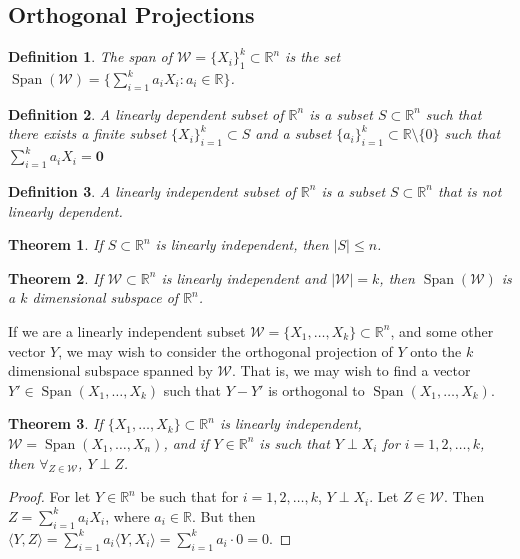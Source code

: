 \documentclass[oneside]{book}
\theoremstyle{mystyle}
\newtheorem{theorem}{Theorem}[section]
\newtheorem{definition}{Definition}[section]
\DeclareMathOperator{\Span}{Span}
\begin{document}
\subsection{Orthogonal Projections}
\begin{definition}
The span of $\mathcal{W}=\{X_{i}\}_{1}^{k} \subset \mathbb{R}^n$ is the set $\Span(\mathcal{W})=\{\sum_{i=1}^{k} a_i X_i: a_i \in \mathbb{R}\}$.
\end{definition}
\begin{definition}
A linearly dependent subset of $\mathbb{R}^{n}$ is a subset $S\subset\mathbb{R}^{n}$ such that there exists a finite subset $\{X_{i}\}_{i=1}^{k}\subset S$ and a subset $\{a_{i}\}_{i=1}^{k}\subset \mathbb{R}\setminus \{0\}$ such that $\sum_{i=1}^{k}a_{i}X_{i}=\mathbf{0}$
\end{definition}
\begin{definition}
A linearly independent subset of $\mathbb{R}^{n}$ is a subset $S\subset \mathbb{R}^{n}$ that is not linearly dependent.
\end{definition}
\begin{theorem}
If $S\subset\mathbb{R}^{n}$ is linearly independent, then $|S|\leq n$.
\end{theorem}
\begin{theorem}
If $\mathcal{W}\subset\mathbb{R}^{n}$ is linearly independent and $|\mathcal{W}| = k$, then $\Span(\mathcal{W})$ is a $k$ dimensional subspace of $\mathbb{R}^n$.
\end{theorem}
If we are a linearly independent subset $\mathcal{W}=\{X_1,\hdots, X_k\}\subset\mathbb{R}^n$, and some other vector $Y$, we may wish to consider the orthogonal projection of $Y$ onto the $k$ dimensional subspace spanned by $\mathcal{W}$. That is, we may wish to find a vector $Y'\in\Span(X_1,\hdots, X_k)$ such that $Y-Y'$ is orthogonal to $\Span(X_1,\hdots, X_k)$.
\begin{theorem}
If $\{X_1,\hdots, X_k\}\subset\mathbb{R}^n$ is linearly independent, $\mathcal{W} = \Span(X_1,\hdots, X_n)$, and if $Y\in \mathbb{R}^n$ is such that $Y\perp X_i$ for $i=1,2,\hdots, k$, then $\forall_{Z\in \mathcal{W}}$, $Y\perp Z$.
\end{theorem}
\begin{proof}
For let $Y\in \mathbb{R}^n$ be such that for $i=1,2,\hdots, k$, $Y\perp X_i$. Let $Z\in \mathcal{W}$. Then $Z= \sum_{i=1}^{k} a_i X_i$, where $a_i\in \mathbb{R}$. But then $\langle Y, Z\rangle = \sum_{i=1}^{k} a_i \langle Y, X_i\rangle = \sum_{i=1}^{k} a_i\cdot 0 = 0$. 
\end{proof}
\end{document}
